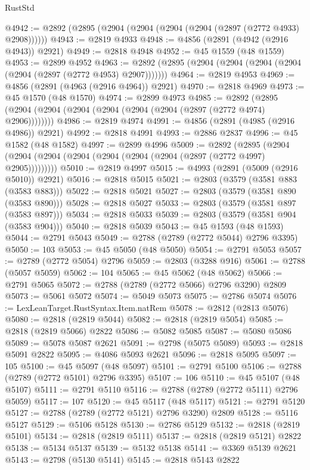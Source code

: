 \begin{lexlean}{RustStd}
\begin{coremodule}
@4942 := @2892 (@2895 (@2904 (@2904 (@2904 (@2904 (@2897 (@2772 @4933) @2908))))))
@4943 := @2819 @4933
@4948 := @4856 (@2891 (@4942 (@2916 @4943)) @2921)
@4949 := @2818 @4948
@4952 := @45 @1559 (@48 @1559)
@4953 := @2899 @4952
@4963 := @2892 (@2895 (@2904 (@2904 (@2904 (@2904 (@2904 (@2897 (@2772 @4953) @2907)))))))
@4964 := @2819 @4953
@4969 := @4856 (@2891 (@4963 (@2916 @4964)) @2921)
@4970 := @2818 @4969
@4973 := @45 @1570 (@48 @1570)
@4974 := @2899 @4973
@4985 := @2892 (@2895 (@2904 (@2904 (@2904 (@2904 (@2904 (@2904 (@2897 (@2772 @4974) @2906))))))))
@4986 := @2819 @4974
@4991 := @4856 (@2891 (@4985 (@2916 @4986)) @2921)
@4992 := @2818 @4991
@4993 := @2886 @2837
@4996 := @45 @1582 (@48 @1582)
@4997 := @2899 @4996
@5009 := @2892
    (@2895 (@2904 (@2904 (@2904 (@2904 (@2904 (@2904 (@2904 (@2897 (@2772 @4997) @2905)))))))))
@5010 := @2819 @4997
@5015 := @4993 (@2891 (@5009 (@2916 @5010)) @2921)
@5016 := @2818 @5015
@5021 := @2803 (@3579 (@3581 @883 (@3583 @883)))
@5022 := @2818 @5021
@5027 := @2803 (@3579 (@3581 @890 (@3583 @890)))
@5028 := @2818 @5027
@5033 := @2803 (@3579 (@3581 @897 (@3583 @897)))
@5034 := @2818 @5033
@5039 := @2803 (@3579 (@3581 @904 (@3583 @904)))
@5040 := @2818 @5039
@5043 := @45 @1593 (@48 @1593)
@5044 := @2791 @5043
@5049 := @2788 (@2789 (@2772 @5044) @2796 @3395)
@5050 := 103
@5053 := @45 @5050 (@48 @5050)
@5054 := @2791 @5053
@5057 := @2789 (@2772 @5054) @2796
@5059 := @2803 (@3288 @916)
@5061 := @2788 (@5057 @5059)
@5062 := 104
@5065 := @45 @5062 (@48 @5062)
@5066 := @2791 @5065
@5072 := @2788 (@2789 (@2772 @5066) @2796 @3290) @2809
@5073 := @5061 @5072
@5074 := @5049 @5073
@5075 := @2786 @5074
@5076 := LexLeanTarget.RustSyntax.Item.natRem
@5078 := @2812 (@2813 @5076)
@5080 := @2818 (@2819 @5044)
@5082 := @2818 (@2819 @5054)
@5085 := @2818 (@2819 @5066) @2822
@5086 := @5082 @5085
@5087 := @5080 @5086
@5089 := @5078 @5087 @2621
@5091 := @2798 (@5075 @5089)
@5093 := @2818 @5091 @2822
@5095 := @4086 @5093 @2621
@5096 := @2818 @5095
@5097 := 105
@5100 := @45 @5097 (@48 @5097)
@5101 := @2791 @5100
@5106 := @2788 (@2789 (@2772 @5101) @2796 @3395)
@5107 := 106
@5110 := @45 @5107 (@48 @5107)
@5111 := @2791 @5110
@5116 := @2788 (@2789 (@2772 @5111) @2796 @5059)
@5117 := 107
@5120 := @45 @5117 (@48 @5117)
@5121 := @2791 @5120
@5127 := @2788 (@2789 (@2772 @5121) @2796 @3290) @2809
@5128 := @5116 @5127
@5129 := @5106 @5128
@5130 := @2786 @5129
@5132 := @2818 (@2819 @5101)
@5134 := @2818 (@2819 @5111)
@5137 := @2818 (@2819 @5121) @2822
@5138 := @5134 @5137
@5139 := @5132 @5138
@5141 := @3369 @5139 @2621
@5143 := @2798 (@5130 @5141)
@5145 := @2818 @5143 @2822

\end{coremodule}
\end{lexlean}

